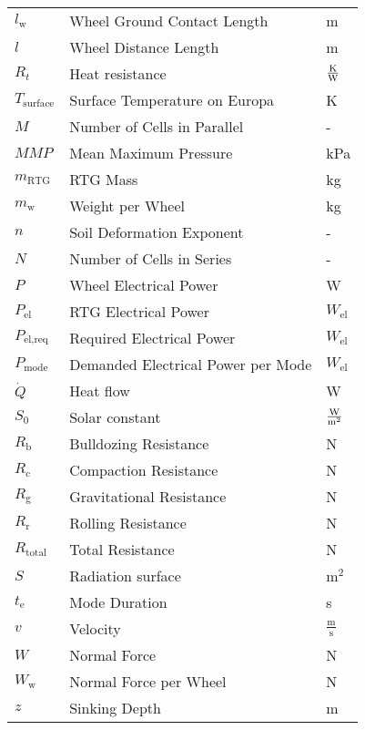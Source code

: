 \begin{longtable}[l]{lll}
\(l_\text{w}\)			&	Wheel Ground Contact Length					& m								\\
\(l\)					&	Wheel Distance Length						& m								\\
$R_t$					&	Heat resistance								& $\frac{{\rm K}}{{\rm W}}$				\\
\(T_\text{surface}\)	&	Surface Temperature on Europa				&	K							\\
$M$						&	Number of Cells in Parallel					& -								\\
\(MMP\)					& 	Mean Maximum Pressure 						& kPa							\\
$m_\text{RTG}$			&	RTG Mass									& kg							\\
\(m_\text{w}\)			&	Weight per Wheel							& kg							\\
\(n\)					&	Soil Deformation Exponent					& -								\\
$N$						&	Number of Cells in Series					& -								\\
\(P\)					&	Wheel Electrical  Power						& W								\\
$P_\text{el}$			&	RTG Electrical Power						& $W_\text{el}$					\\
$P_\text{el,req}$		&	Required Electrical Power					& $W_\text{el}$					\\
$P_\text{mode}$			&	Demanded Electrical Power per Mode			& $W_\text{el}$					\\
$\dot{Q}$				&	Heat flow									& W								\\
	$S_0$					&	Solar constant 							& $\frac{{\rm W}}{{\rm m}^2}$				\\
\(R_\text{b}\)			&	Bulldozing Resistance						& N								\\
\(R_\text{c}\)			&	Compaction Resistance						& N								\\
\(R_\text{g}\)			&	Gravitational Resistance					& N								\\
\(R_\text{r}\)			&	Rolling Resistance							& N								\\
\(R_\text{total}\)		&	Total Resistance							& N								\\
\(S\)					&	Radiation surface							& m$^2$							\\
$t_\text{e}$			&	Mode Duration								& s								\\
\(v\)					&	Velocity									& \(\frac{\text{m}}{\text{s}}\)	\\
\(W\)					&	Normal Force 								& N								\\
\(W_\text{w}\)			&	Normal Force per Wheel						& N								\\
\(z\)					&	Sinking Depth								& m								\\



\end{longtable}
